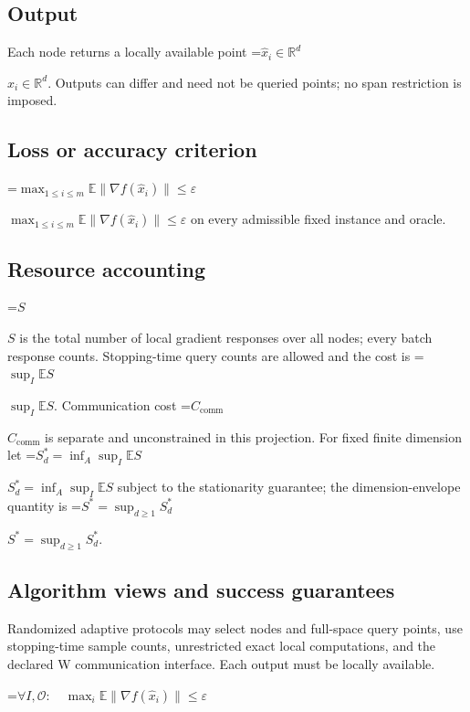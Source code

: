 \documentclass[10pt,a4paper]{article}
\newcommand{\AtlasMath}[1]{\par\begingroup\centering\setbox0=\hbox{$\displaystyle #1$}\ifdim\wd0>1.4\linewidth\typeout{ATLAS WIDE FORMULA: \the\wd0}\fi\ifdim\wd0>\linewidth\resizebox{\linewidth}{!}{\box0}\else\box0\fi\par\endgroup}
\newcommand{\AtlasInlineMath}[1]{\begingroup\setbox0=\hbox{$#1$}\ifdim\wd0>.4\linewidth\endgroup\AtlasMath{#1}\else\endgroup$#1$\fi}
\begin{document}
\subsection{Output}


Each node returns a locally available point \AtlasInlineMath{\widehat x_i\in\mathbb R^d}. Outputs can differ and need not be queried points; no span restriction is imposed.



\subsection{Loss or accuracy criterion}


\AtlasInlineMath{\max_{1\le i\le m}\mathbb E\|\nabla f(\widehat x_i)\|\le\varepsilon} on every admissible fixed instance and oracle.



\subsection{Resource accounting}


\AtlasInlineMath{S} is the total number of local gradient responses over all nodes; every batch response counts. Stopping-time query counts are allowed and the cost is \AtlasInlineMath{\sup_I\mathbb E S}. Communication cost \AtlasInlineMath{C_{\mathrm{comm}}} is separate and unconstrained in this projection. For fixed finite dimension let \AtlasInlineMath{S_d^*=\inf_A\sup_I\mathbb E S} subject to the stationarity guarantee; the dimension-envelope quantity is \AtlasInlineMath{S^*=\sup_{d\ge1}S_d^*}.



\subsection{Algorithm views and success guarantees}


Randomized adaptive protocols may select nodes and full-space query points, use stopping-time sample counts, unrestricted exact local computations, and the declared W communication interface. Each output must be locally available.




\AtlasMath{\forall I,\mathcal O:\quad\max_i\mathbb E\|\nabla f(\widehat x_i)\|\le\varepsilon}
\end{document}
